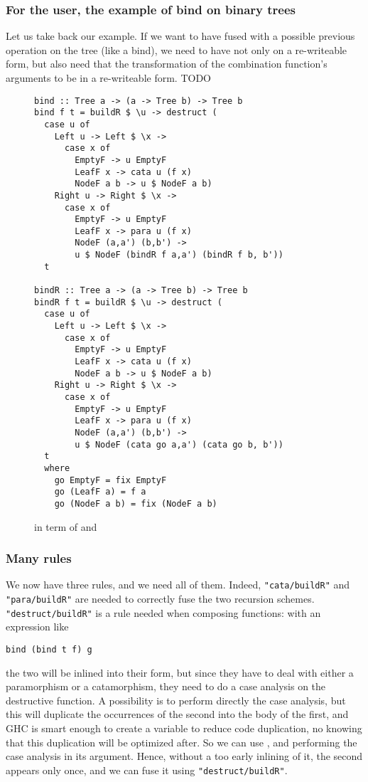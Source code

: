 \subsubsection{For the user, the example of bind on binary trees}
Let us take back our  example. If we want to have  fused with a possible previous operation on the tree (like a bind), we need to have not only  on a re-writeable form, but also need that the transformation of the combination function's arguments to be in a re-writeable form. TODO
\begin{figure}
\begin{verbatim}
bind :: Tree a -> (a -> Tree b) -> Tree b
bind f t = buildR $ \u -> destruct (
  case u of
    Left u -> Left $ \x -> 
      case x of
        EmptyF -> u EmptyF
        LeafF x -> cata u (f x)
        NodeF a b -> u $ NodeF a b)
    Right u -> Right $ \x ->
      case x of
        EmptyF -> u EmptyF
        LeafF x -> para u (f x)
        NodeF (a,a') (b,b') -> 
        u $ NodeF (bindR f a,a') (bindR f b, b'))
  t

bindR :: Tree a -> (a -> Tree b) -> Tree b
bindR f t = buildR $ \u -> destruct (
  case u of
    Left u -> Left $ \x -> 
      case x of
        EmptyF -> u EmptyF
        LeafF x -> cata u (f x)
        NodeF a b -> u $ NodeF a b)
    Right u -> Right $ \x ->
      case x of
        EmptyF -> u EmptyF
        LeafF x -> para u (f x)
        NodeF (a,a') (b,b') -> 
        u $ NodeF (cata go a,a') (cata go b, b'))
  t
  where
    go EmptyF = fix EmptyF
    go (LeafF a) = f a
    go (NodeF a b) = fix (NodeF a b)

\end{verbatim}
\caption{ in term of  and }
\label{fig:bindbuild}
\end{figure}

\subsubsection{Many rules}
We now have three rules, and we need all of them. Indeed, \verb|"cata/buildR"| and \verb|"para/buildR"| are needed to correctly fuse the two recursion schemes. \verb|"destruct/buildR"| is a rule needed when composing functions: with an expression like
\begin{verbatim}
bind (bind t f) g
\end{verbatim}
\noindent the two  will be inlined into their  form, but since they have to deal with either a paramorphism or a catamorphism, they need to do a case analysis on the destructive function. A possibility is to perform directly the case analysis, but this will duplicate the occurrences of the second  into the body of the first, and GHC is smart enough to create a variable to reduce code duplication, no knowing that this duplication will be optimized after. So we can use , and performing the case analysis in its argument. Hence, without a too early inlining of it, the second  appears only once, and we can fuse it using \verb|"destruct/buildR"|.

